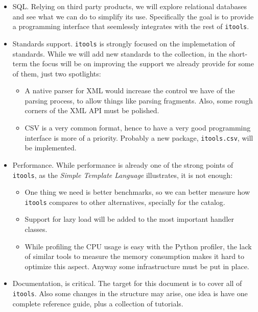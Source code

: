 \begin{itemize}
  \item SQL. Relying on third party products, we will explore relational
    databases and see what we can do to simplify its use. Specifically
    the goal is to provide a programming interface that seemlessly integrates
    with the rest of {\tt itools}.

  \item Standards support. {\tt itools} is strongly focused on the
    implemetation of standards. While we will add new standards to the
    collection, in the short-term the focus will be on improving the
    support we already provide for some of them, just two spotlights:

     \begin{itemize}
       \item A native parser for XML would increase the control we have of
         the parsing process, to allow things like parsing fragments. Also,
         some rough corners of the XML API must be polished.

       \item CSV is a very common format, hence to have a very good
         programming interface is more of a priority. Probably a new
         package, {\tt itools.csv}, will be implemented.
     \end{itemize}

  \item Performance. While performance is already one of the strong points
    of {\tt itools}, as the {\em Simple Template Language} illustrates, it
    is not enough:

    \begin{itemize}
      \item One thing we need is better benchmarks, so we can better
        measure how {\tt itools} compares to other alternatives, specially
        for the catalog.

      \item Support for lazy load will be added to the most important handler
        classes.

      \item While profiling the CPU usage is easy with the Python profiler,
        the lack of similar tools to measure the memory consumption makes
        it hard to optimize this aspect. Anyway some infrastructure must be
        put in place.
    \end{itemize}

  \item Documentation, is critical. The target for this document is to cover
    all of {\tt itools}. Also some changes in the structure may arise, one
    idea is have one complete reference guide, plus a collection of
    tutorials.


\end{itemize}

